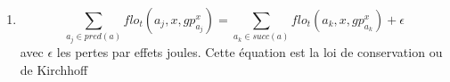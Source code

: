\begin{enumerate}
		\item 
			\begin{equation}
				\sum_{a_{j} \in pred(a)} flo_t(a_{j},x,gp_{a_{j}}^{x}) = \sum_{a_{k} \in succ(a)} flo_t(a_{k},x,gp_{a_{k}}^{x}) + \epsilon 
			\end{equation}
		avec $\epsilon$ les pertes par effets joules. Cette \'equation est la loi de conservation ou de Kirchhoff

\end{enumerate}


